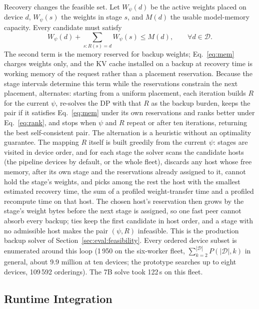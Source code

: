 Recovery changes the feasible set.  Let $W_{\psi}(d)$ be the active weights
placed on device $d$, $W_{\psi}(s)$ the weights in stage $s$, and $M(d)$ the
usable model-memory capacity.  Every candidate must satisfy
\begin{equation}\label{eq:mem}
  W_{\psi}(d)+\sum_{s:R(s)=d}W_{\psi}(s)\leq M(d),
  \qquad \forall d\in\mathcal{D}.
\end{equation}
The second term is the memory reserved for backup weights; Eq.~\ref{eq:mem}
charges weights only, and the KV cache installed on a backup at recovery
time is working memory of the request rather than a placement reservation.  Because the
stage intervals determine this term while the reservations constrain the
next placement, \sys{} alternates: starting from a uniform placement, each
iteration builds $R$ for the current $\psi$, re-solves the DP with that $R$
as the backup burden, keeps the pair if it satisfies Eq.~\ref{eq:mem} under
its own reservations and ranks better under Eq.~\ref{eq:rank}, and stops
when $\psi$ and $R$ repeat or after ten iterations,
returning the best self-consistent pair.  The alternation is a heuristic
without an optimality guarantee.  The mapping $R$ itself is built greedily
from the current $\psi$: stages are visited in device order, and for each
stage the solver scans the candidate hosts (the pipeline devices by default,
or the whole fleet), discards any host whose free memory, after its own
stage and the reservations already assigned to it, cannot hold the stage's
weights, and picks among the rest the host with the smallest estimated
recovery time, the sum of a profiled weight-transfer time and a profiled
recompute time on that host.  The chosen host's reservation then grows by
the stage's weight bytes before the next stage is assigned, so one fast
peer cannot absorb every backup; ties keep the first candidate in host
order, and a stage with no admissible host makes the pair $(\psi,R)$
infeasible.  This is the production backup solver of
Section~\ref{sec:eval:feasibility}.  Every ordered device subset is enumerated around this loop (1\,950 on the
six-worker fleet, $\sum_{k=2}^{|\mathcal{D}|}P(|\mathcal{D}|,k)$ in general,
about 9.9 million at ten devices; the prototype searches up to eight
devices, 109\,592 orderings).  The 7B solve took 122\,s on this fleet.


\subsection{Runtime Integration}\label{sec:design:runtime}
\label{sec:design:async}


